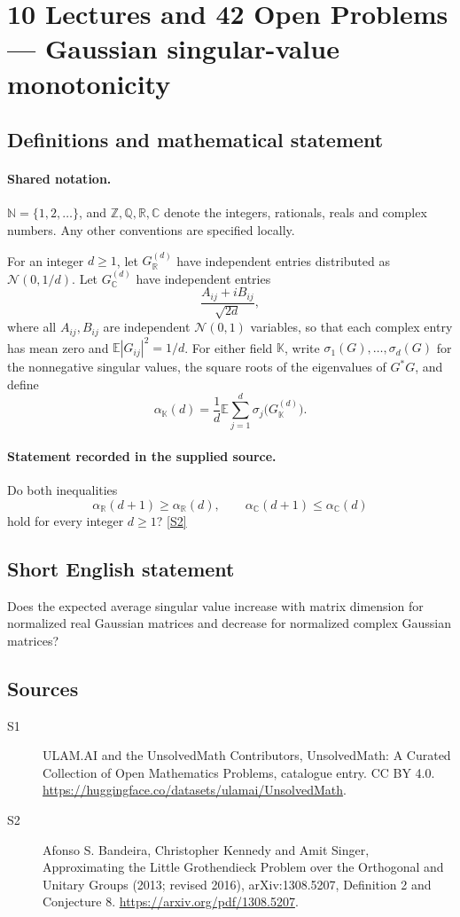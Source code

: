 \documentclass[11pt]{article}
\newcommand{\sref}[2]{\hyperlink{source:#1:#2}{[S#2]}}
\begin{document}
\section{10 Lectures and 42 Open Problems — Gaussian singular-value monotonicity}\label{statement}

\subsection{Definitions and mathematical statement}

\paragraph{Shared notation.}$\mathbb N=\{1,2,\ldots\}$, and $\mathbb Z,\mathbb Q,\mathbb R,\mathbb C$ denote the integers, rationals, reals and complex numbers. Any other conventions are specified locally.


For an integer \(d\ge1\), let \(G_{\mathbb R}^{(d)}\) have independent entries distributed as \(\mathcal N(0,1/d)\). Let \(G_{\mathbb C}^{(d)}\) have independent entries
\[\frac{A_{ij}+iB_{ij}}{\sqrt{2d}},\]
where all \(A_{ij},B_{ij}\) are independent \(\mathcal N(0,1)\) variables, so that each complex entry has mean zero and \(\mathbb E|G_{ij}|^2=1/d\). For either field \(\mathbb K\), write \(\sigma_1(G),\ldots,\sigma_d(G)\) for the nonnegative singular values, the square roots of the eigenvalues of \(G^*G\), and define
\[\alpha_{\mathbb K}(d)=\frac1d\mathbb E\sum_{j=1}^d\sigma_j\bigl(G_{\mathbb K}^{(d)}\bigr).\]
\paragraph{Statement recorded in the supplied source.}
Do both inequalities
\[\alpha_{\mathbb R}(d+1)\ge\alpha_{\mathbb R}(d),\qquad
  \alpha_{\mathbb C}(d+1)\le\alpha_{\mathbb C}(d)\]
hold for every integer \(d\ge1\)? \sref{statement}{2}
\subsection{Short English statement}
Does the expected average singular value increase with matrix dimension for normalized real Gaussian matrices and decrease for normalized complex Gaussian matrices?
\subsection{Sources}
\begin{description}
\item[\hypertarget{source:statement:1}{S1}] ULAM.AI and the UnsolvedMath Contributors, UnsolvedMath: A Curated Collection of Open Mathematics Problems, catalogue entry. CC BY 4.0. \url{https://huggingface.co/datasets/ulamai/UnsolvedMath}.
\item[\hypertarget{source:statement:2}{S2}] Afonso S. Bandeira, Christopher Kennedy and Amit Singer, Approximating the Little Grothendieck Problem over the Orthogonal and Unitary Groups (2013; revised 2016), arXiv:1308.5207, Definition 2 and Conjecture 8. \url{https://arxiv.org/pdf/1308.5207}.
\end{description}
\label{end:statement}
\end{document}
